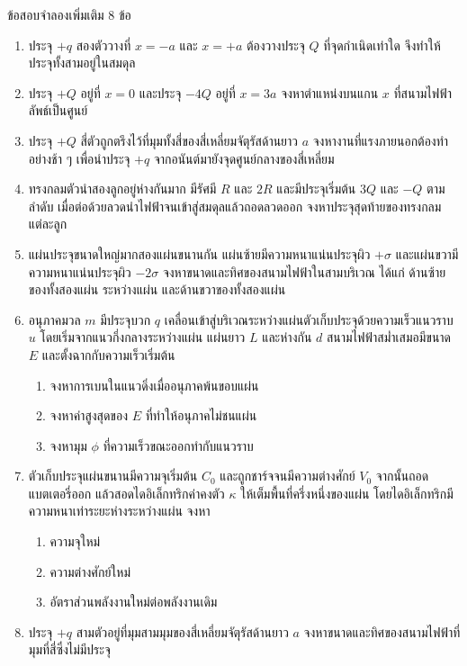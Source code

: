 \begin{exercisebox}{ข้อสอบจำลองเพิ่มเติม 8 ข้อ}
\begin{enumerate}
    \item ประจุ $+q$ สองตัววางที่ $x=-a$ และ $x=+a$ ต้องวางประจุ $Q$ ที่จุดกำเนิดเท่าใด จึงทำให้ประจุทั้งสามอยู่ในสมดุล

    \item ประจุ $+Q$ อยู่ที่ $x=0$ และประจุ $-4Q$ อยู่ที่ $x=3a$ จงหาตำแหน่งบนแกน $x$ ที่สนามไฟฟ้าลัพธ์เป็นศูนย์

    \item ประจุ $+Q$ สี่ตัวถูกตรึงไว้ที่มุมทั้งสี่ของสี่เหลี่ยมจัตุรัสด้านยาว $a$ จงหางานที่แรงภายนอกต้องทำอย่างช้า ๆ เพื่อนำประจุ $+q$ จากอนันต์มายังจุดศูนย์กลางของสี่เหลี่ยม

    \item ทรงกลมตัวนำสองลูกอยู่ห่างกันมาก มีรัศมี $R$ และ $2R$ และมีประจุเริ่มต้น $3Q$ และ $-Q$ ตามลำดับ เมื่อต่อด้วยลวดนำไฟฟ้าจนเข้าสู่สมดุลแล้วถอดลวดออก จงหาประจุสุดท้ายของทรงกลมแต่ละลูก

    \item แผ่นประจุขนาดใหญ่มากสองแผ่นขนานกัน แผ่นซ้ายมีความหนาแน่นประจุผิว $+\sigma$ และแผ่นขวามีความหนาแน่นประจุผิว $-2\sigma$ จงหาขนาดและทิศของสนามไฟฟ้าในสามบริเวณ ได้แก่ ด้านซ้ายของทั้งสองแผ่น ระหว่างแผ่น และด้านขวาของทั้งสองแผ่น

    \item อนุภาคมวล $m$ มีประจุบวก $q$ เคลื่อนเข้าสู่บริเวณระหว่างแผ่นตัวเก็บประจุด้วยความเร็วแนวราบ $u$ โดยเริ่มจากแนวกึ่งกลางระหว่างแผ่น แผ่นยาว $L$ และห่างกัน $d$ สนามไฟฟ้าสม่ำเสมอมีขนาด $E$ และตั้งฉากกับความเร็วเริ่มต้น
    \begin{enumerate}
        \item จงหาการเบนในแนวดิ่งเมื่ออนุภาคพ้นขอบแผ่น
        \item จงหาค่าสูงสุดของ $E$ ที่ทำให้อนุภาคไม่ชนแผ่น
        \item จงหามุม $\phi$ ที่ความเร็วขณะออกทำกับแนวราบ
    \end{enumerate}

    \item ตัวเก็บประจุแผ่นขนานมีความจุเริ่มต้น $C_0$ และถูกชาร์จจนมีความต่างศักย์ $V_0$ จากนั้นถอดแบตเตอรี่ออก แล้วสอดไดอิเล็กทริกค่าคงตัว $\kappa$ ให้เต็มพื้นที่ครึ่งหนึ่งของแผ่น โดยไดอิเล็กทริกมีความหนาเท่าระยะห่างระหว่างแผ่น จงหา
    \begin{enumerate}
        \item ความจุใหม่
        \item ความต่างศักย์ใหม่
        \item อัตราส่วนพลังงานใหม่ต่อพลังงานเดิม
    \end{enumerate}

    \item ประจุ $+q$ สามตัวอยู่ที่มุมสามมุมของสี่เหลี่ยมจัตุรัสด้านยาว $a$ จงหาขนาดและทิศของสนามไฟฟ้าที่มุมที่สี่ซึ่งไม่มีประจุ
\end{enumerate}
\end{exercisebox}

